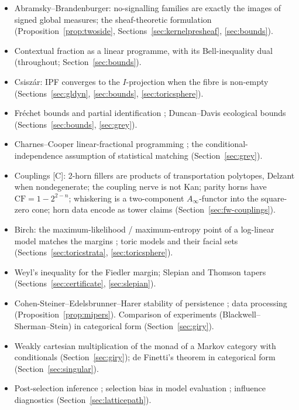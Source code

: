 \documentclass[11pt]{article}
\theoremstyle{definition}
\theoremstyle{remark}
\newcommand{\CF}{\mathrm{CF}}
\newcommand{\src}[1]{\textsf{\small[#1]}}
\begin{document}
\begin{itemize}[itemsep=0pt]
  \item Abramsky--Brandenburger: no-signalling families are exactly the images of signed global measures; the sheaf-theoretic formulation \cite{ab11} (Proposition~\ref{prop:twoside}, Sections~\ref{sec:kernelpresheaf}, \ref{sec:bounds}).
  \item Contextual fraction as a linear programme, with its Bell-inequality dual \cite{abm17} (throughout; Section~\ref{sec:bounds}).
  \item Csisz\'ar: IPF converges to the $I$-projection when the fibre is non-empty \cite{csiszar} (Sections~\ref{sec:gldyn}, \ref{sec:bounds}, \ref{sec:toricsphere}).
  \item Fr\'echet bounds and partial identification \cite{frechet51,manski03}; Duncan--Davis ecological bounds \cite{duncandavis53} (Sections~\ref{sec:bounds}, \ref{sec:grey}).
  \item Charnes--Cooper linear-fractional programming \cite{charnescooper}; the conditional-independence assumption of statistical matching \cite{dorazio06} (Section~\ref{sec:grey}).
  \item Couplings \src{C}: 2-horn fillers are products of transportation polytopes, Delzant when nondegenerate; the coupling nerve is not Kan; parity horns have $\CF=1-2^{2-n}$; whiskering is a two-component $A_\infty$-functor into the square-zero cone; horn data encode as tower claims \cite{awasthiC,awasthiF} (Section~\ref{sec:fw-couplings}).
  \item Birch: the maximum-likelihood / maximum-entropy point of a log-linear model matches the margins \cite{birch63}; toric models and their facial sets \cite{gms06,fr12,efrs06} (Sections~\ref{sec:toricstrata}, \ref{sec:toricsphere}).
  \item Weyl's inequality for the Fiedler margin; Slepian and Thomson tapers \cite{slepian,thomson} (Sections~\ref{sec:certificate}, \ref{sec:slepian}).
  \item Cohen-Steiner--Edelsbrunner--Harer stability of persistence \cite{ceh}; data processing (Proposition~\ref{prop:mipers}). Comparison of experiments (Blackwell--Sherman--Stein) in categorical form \cite{fgpr20} (Section~\ref{sec:giry}).
  \item Weakly cartesian multiplication of the monad of a Markov category with conditionals \cite{bohinenperrone25} (Section~\ref{sec:giry}); de Finetti's theorem in categorical form \cite{fgp21} (Section~\ref{sec:singular}).
  \item Post-selection inference \cite{cox75,posi,fithian}; selection bias in model evaluation \cite{varma06,cawley10}; influence diagnostics \cite{cook77,bkw80} (Section~\ref{sec:latticepath}).

\end{itemize}
\end{document}
